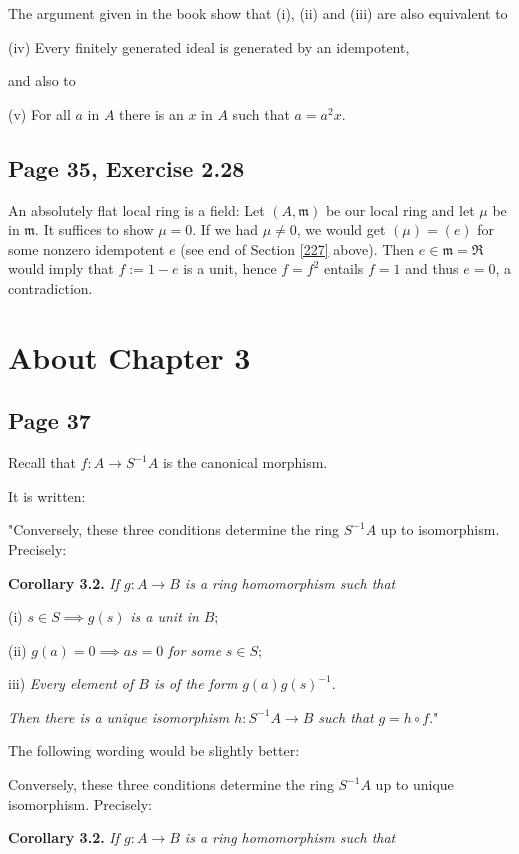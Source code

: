 \documentclass[parskip=half,fontsize=12pt]{scrartcl}%
\newcommand{\mf}{\mathfrak}
\begin{document}
The argument given in the book show that (i), (ii) and (iii) are also equivalent to

(iv) Every finitely generated ideal is generated by an idempotent,

and also to 

(v) For all $a$ in $A$ there is an $x$ in $A$ such that $a=a^2x$.

\subsection{Page 35, Exercise 2.28}\label{228}%

An absolutely flat local ring is a field: Let $(A,\mf m)$ be our local ring and let $\mu$ be in $\mf m$. It suffices to show $\mu=0$. If we had $\mu\ne0$, we would get $(\mu)=(e)$ for some nonzero idempotent $e$ (see end of Section \ref{227} above). Then $e\in\mf m=\mf R$ would imply that $f:=1-e$ is a unit, hence $f=f^2$ entails $f=1$ and thus $e=0$, a contradiction. 

\section{About Chapter 3}%

\subsection{Page 37}%

Recall that $f:A\to S^{-1}A$ is the canonical morphism.

It is written:

"Conversely, these three conditions determine the ring $S^{-1}A$ up to isomorphism. Precisely:

\textbf{Corollary 3.2.} \emph{If $g:A\to B$ is a ring homomorphism such that}

(i) $s\in S\implies g(s)$ \emph{is a unit in} $B$;

(ii) $g(a)=0\implies as=0$ \emph{for some} $s\in S$;

iii) \emph{Every element of $B$ is of the form} $g(a)g(s)^{-1}$.

\emph{Then there is a unique isomorphism $h:S^{-1}A\to B$ such that} $g=h\circ f$."

The following wording would be slightly better:

Conversely, these three conditions determine the ring $S^{-1}A$ up to unique isomorphism. Precisely:

\textbf{Corollary 3.2.} \emph{If $g:A\to B$ is a ring homomorphism such that}
\end{document}
